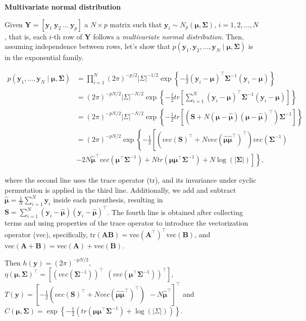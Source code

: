 \begin{enumerate}
\textbf{Multivariate normal distribution}

Given $\bm{Y}=[\bm{y}_1 \ \bm{y}_2 \ \dots \ \bm{y}_p]$ a $N\times p$ matrix such that $\bm{y}_i\sim N_p(\bm{\mu},\bm{\Sigma})$, $i=1,2,\dots,N$, that is, each $i$-th row of $\bm{Y}$ follows a \textit{multivariate normal distribution}. Then, assuming independence between rows, let's show that $p(\bm{y}_1,\bm{y}_2,\dots,\bm{y}_N\mid \bm{\mu},\bm{\Sigma})$ is in the exponential family.

{\footnotesize{
\begin{align}
	p(\bm{y}_1,\dots,\bm{y}_N\mid \bm{\mu},\bm{\Sigma})&=\prod_{i=1}^N (2\pi)^{-p/2}| \Sigma|^{-1/2}\exp\left\{-\frac{1}{2}\left(\bm{y}_i-\bm{\mu}\right)^{\top}\bm{\Sigma}^{-1}\left(\bm{y}_i-\bm{\mu}\right)\right\}\nonumber\\
	&= (2\pi)^{-pN/2}|\Sigma|^{-N/2}\exp\left\{-\frac{1}{2}tr\left[\sum_{i=1}^N\left(\bm{y}_i-\bm{\mu}\right)^{\top}\bm{\Sigma}^{-1}\left(\bm{y}_i-\bm{\mu}\right)\right]\right\}\nonumber\\
	&= (2\pi)^{-p N/2}|\Sigma|^{-N/2}\exp\left\{-\frac{1}{2}tr\left[\left(\bm{S}+N\left(\bm{\mu}-\hat{\bm{\mu}}\right)\left(\bm{\mu}-\hat{\bm{\mu}}\right)^{\top}\right)\bm{\Sigma}^{-1}\right]\right\}\nonumber\\
	&= (2\pi)^{-p N/2}\exp\left\{-\frac{1}{2}\left[\left(vec\left(\bm{S}\right)^{\top}+N vec\left(\hat{\bm{\mu}}\hat{\bm{\mu}}^{\top}\right)^{\top}\right)vec \left(\bm{\Sigma}^{-1}\right)\right.\right.\nonumber\\
	&\left.\left.-2N\hat{\bm{\mu}}^{\top}vec\left(\bm{\mu}^{\top}\bm{\Sigma}^{-1}\right)+N tr\left(\bm{\mu}\bm{\mu}^{\top}\bm{\Sigma}^{-1}\right)+N\log (|\bm{\Sigma}|)\right]\right\}\nonumber,
\end{align}
}}

where the second line uses the trace operator ($\text{tr}$), and its invariance under cyclic permutation is applied in the third line. Additionally, we add and subtract $\hat{\bm{\mu}} = \frac{1}{N}\sum_{i=1}^N \bm{y}_i$ inside each parenthesis, resulting in $\bm{S} = \sum_{i=1}^N \left(\bm{y}_i - \hat{\bm{\mu}}\right) \left(\bm{y}_i - \hat{\bm{\mu}}\right)^{\top}$. The fourth line is obtained after collecting terms and using properties of the trace operator to introduce the vectorization operator ($\text{vec}$), specifically, $ \text{tr}(\bm{AB}) = \text{vec}(\bm{A}^{\top})^{\top} \text{vec}(\bm{B})$, and $ \text{vec}(\bm{A} + \bm{B}) = \text{vec}(\bm{A}) + \text{vec}(\bm{B})$.

Then $h(\bm{y})=(2\pi)^{-pN/2}$, $\eta(\bm{\mu},\bm{\Sigma})^{\top}=\left[\left(vec\left(\bm{\Sigma}^{-1}\right)\right)^{\top} \ \ \left(vec\left(\bm{\mu}^{\top}\bm{\Sigma}^{-1}\right)\right)^{\top}\right]$, $T(\bm{y})=\left[-\frac{1}{2}\left(vec\left(\bm{S}\right)^{\top}+N vec\left(\hat{\bm{\mu}}\hat{\bm{\mu}}^{\top}\right)^{\top}\right) \ \ -N\hat{\bm{\mu}}^{\top}\right]^{\top}$ and $C(\bm{\mu},\bm{\Sigma})=\exp\left\{-\frac{1}{2}\left(tr\left(\bm{\mu}\bm{\mu}^{\top}\bm{\Sigma}^{-1}\right)+\log(|\Sigma|)\right)\right\}$.
\end{enumerate}

